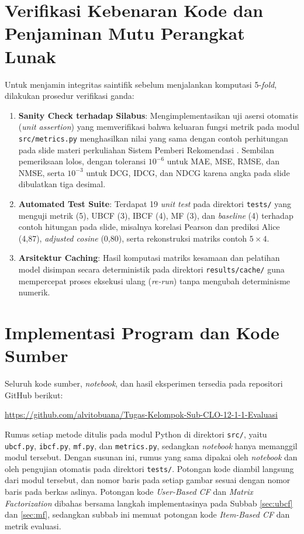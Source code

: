 \section{Verifikasi Kebenaran Kode dan Penjaminan Mutu Perangkat Lunak}
Untuk menjamin integritas saintifik sebelum menjalankan komputasi 5-\textit{fold}, dilakukan prosedur verifikasi ganda:
\begin{enumerate}
    \item \textbf{Sanity Check terhadap Silabus}: Mengimplementasikan uji asersi otomatis (\textit{unit assertion}) yang memverifikasi bahwa keluaran fungsi metrik pada modul \texttt{src/metrics.py} menghasilkan nilai yang sama dengan contoh perhitungan pada slide materi perkuliahan Sistem Pemberi Rekomendasi \citep{baizal2024recsys}. Sembilan pemeriksaan lolos, dengan toleransi $10^{-6}$ untuk MAE, MSE, RMSE, dan NMSE, serta $10^{-3}$ untuk DCG, IDCG, dan NDCG karena angka pada slide dibulatkan tiga desimal.
    \item \textbf{Automated Test Suite}: Terdapat 19 \textit{unit test} pada direktori \texttt{tests/} yang menguji metrik (5), UBCF (3), IBCF (4), MF (3), dan \textit{baseline} (4) terhadap contoh hitungan pada slide, misalnya korelasi Pearson dan prediksi Alice (4,87), \textit{adjusted cosine} (0,80), serta rekonstruksi matriks contoh $5 \times 4$.
    \item \textbf{Arsitektur Caching}: Hasil komputasi matriks kesamaan dan pelatihan model disimpan secara deterministik pada direktori \texttt{results/cache/} guna mempercepat proses eksekusi ulang (\textit{re-run}) tanpa mengubah determinisme numerik.
\end{enumerate}

\section{Implementasi Program dan Kode Sumber}
Seluruh kode sumber, \textit{notebook}, dan hasil eksperimen tersedia pada repositori GitHub berikut:
\begin{center}
{\footnotesize\url{https://github.com/alvitobuana/Tugas-Kelompok-Sub-CLO-12-1-1-Evaluasi}}
\end{center}
Rumus setiap metode ditulis pada modul Python di direktori \texttt{src/}, yaitu \texttt{ubcf.py}, \texttt{ibcf.py}, \texttt{mf.py}, dan \texttt{metrics.py}, sedangkan \textit{notebook} hanya memanggil modul tersebut. Dengan susunan ini, rumus yang sama dipakai oleh \textit{notebook} dan oleh pengujian otomatis pada direktori \texttt{tests/}. Potongan kode diambil langsung dari modul tersebut, dan nomor baris pada setiap gambar sesuai dengan nomor baris pada berkas aslinya. Potongan kode \textit{User-Based CF} dan \textit{Matrix Factorization} dibahas bersama langkah implementasinya pada Subbab \ref{sec:ubcf} dan \ref{sec:mf}, sedangkan subbab ini memuat potongan kode \textit{Item-Based CF} dan metrik evaluasi.


